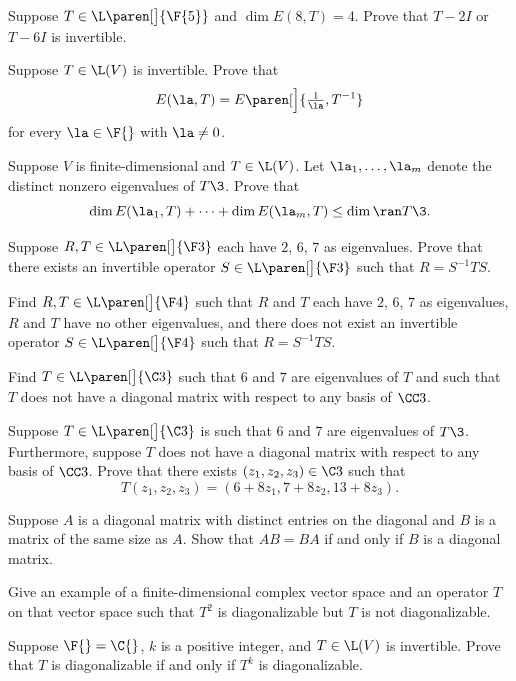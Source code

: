 \exercise
Suppose $T \in \L\paren[\big]{\F{5}}$ and $\dim E(8, T) = 4$. Prove that $T - 2I$ or $T - 6I$ is invertible.

\pagebreak[1]


\exercise
Suppose $T \in \L(V)$ is invertible. Prove that
\[
E(\la, T) = E\paren[\Big]{\tfrac{1}{\la}, T^{-1}}
\]
for every $\la \in \F{}$ with $\la \ne 0$.


\exercise
Suppose $V$ is finite-dimensional and $T \in \L(V)$. Let $\la_1, \dots, \la_m$ denote the distinct nonzero eigenvalues of $T\3$. Prove that
\[
\dim E(\la_1, T) + \dots + \dim E(\la_m, T) \le \dim \ran T\3.
\]
\exercisedisplayend


\exercise
Suppose $R, T \in \L\paren[\big]{\F3}$ each have $2$, $6$, $7$ as eigenvalues. Prove that there exists an invertible operator $S \in \L\paren[\big]{\F3}$ such that $R = S^{-1} T S$.


\exercise
Find $R, T \in \L\paren[\big]{\F4}$ such that $R$ and $T$ each have $2$, $6$, $7$ as eigenvalues, $R$ and $T$ have no other eigenvalues, and there does not exist an invertible operator $S \in \L\paren[\big]{\F4}$ such that $R = S^{-1} T S$.


\exercise
Find $T \in \L\paren[\big]{\C3}$ such that $6$ and $7$ are eigenvalues of $T$ and such that $T$ does not have a diagonal matrix with respect to any basis of $\CC3$.


\exercise
Suppose $T \in \L\paren[\big]{\C3}$ is such that $6$ and $7$ are eigenvalues of $T\3$. Furthermore, suppose $T$ does not have a diagonal matrix with respect to any basis of $\CC3$. Prove that there exists $(z_1, z_2, z_3) \in \C3$ such that
\[
T(z_1, z_2, z_3) = (6 + 8z_1, 7 + 8z_2, 13 + 8z_3).
\]
\exercisedisplayend


\exercise
Suppose $A$ is a diagonal matrix with distinct entries on the diagonal and $B$ is a matrix of the same size as $A$. Show that $AB = BA$ if and only if $B$ is a diagonal matrix.


\exercise
\begin{SUBtheorem}
\item
Give an example of a finite-dimensional complex vector space and an operator $T$ on that vector space such that $T^2$ is diagonalizable but $T$ is not diagonalizable.
\item
Suppose $\F{} = \C{}$, $k$ is a positive integer, and $T \in \L(V)$ is invertible. Prove that $T$ is diagonalizable if and only if $T^k$ is diagonalizable.
\end{SUBtheorem}


